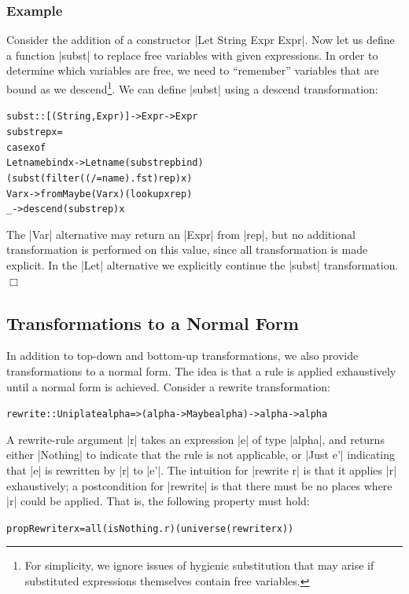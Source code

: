 \documentclass[preprint]{sigplanconf}
\newcounter{exmp}
\newcommand{\yesexample}{\refstepcounter{exmp}\subsubsection*{Example \arabic{exmp}}}
\newcommand{\noexample}{\hfill$\Box$}
\newenvironment{code}{\begin{alltt}\small}{\end{alltt}}
\newenvironment{example}{\yesexample}{\noexample}
\newcommand{\ignore}{}
\begin{document}
\begin{example}
Consider the addition of a constructor \ignore|Let String Expr Expr|. Now let us define a function |subst| to replace free variables with given expressions. In order to determine which variables are free, we need to ``remember'' variables that are bound as we descend\footnote{For simplicity, we ignore issues of hygienic substitution that may arise if substituted expressions themselves contain free variables.}. We can define |subst| using a descend transformation:

\begin{code}
subst :: [(String,Expr)] -> Expr -> Expr
subst rep x =
    case  x of
          Let name bind x -> Let name (subst rep bind)
              (subst (filter ((/= name) . fst) rep) x)
          Var x -> fromMaybe (Var x) (lookup x rep)
          _ -> descend (subst rep) x
\end{code}

The |Var| alternative may return an |Expr| from |rep|, but no additional transformation is performed on this value, since all transformation is made explicit. In the |Let| alternative we explicitly continue the |subst| transformation.
\end{example}

\subsection{Transformations to a Normal Form}

In addition to top-down and bottom-up transformations, we also provide transformations to a normal form. The idea is that a rule is applied exhaustively until a normal form is achieved. Consider a rewrite transformation:

\begin{code}
rewrite :: Uniplate alpha => (alpha -> Maybe alpha) -> alpha -> alpha
\end{code}

A rewrite-rule argument |r| takes an expression |e| of type |alpha|, and returns either |Nothing| to indicate that the rule is not applicable, or |Just e'| indicating that |e| is rewritten by |r| to |e'|. The intuition for |rewrite r| is that it applies |r| exhaustively; a postcondition for |rewrite| is that there must be no places where |r| could be applied. That is, the following property must hold:

\begin{code}
propRewrite r x = all (isNothing . r) (universe (rewrite r x))
\end{code}
\end{document}
